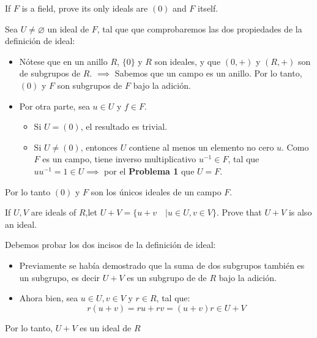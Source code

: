 \begin{problema}[Problema 2]
    If $F$ is a field, prove its only ideals are $(0)$ and $F$ itself.
    \begin{dem}
        Sea $U \neq \varnothing$ un ideal de  $F$, tal que que comprobaremos las dos propiedades de la definición de ideal: 

        \begin{itemize}
            \item Nótese que en un anillo $R$, $\{0\}$ y $R$ son ideales, y que $(0,+)$ y $(R,+)$ son de subgrupos de $R$. $\implies$ Sabemos que un campo es un anillo. Por lo tanto, $(0)$ y $F$ son subgrupos de $F$ bajo la adición. 
            \item Por otra parte, sea $u\in U$ y $f\in F$. 
                \begin{itemize}
                    \item Si $U=(0)$, el resultado es trivial. 
                    \item Si $U\neq (0)$, entonces $U$ contiene al menos un elemento no cero $u$. Como $F$ es un campo, tiene inverso multiplicativo $u^{-1}\in F$, tal que $uu^{-1}=1\in U\implies$ por el \textbf{Problema 1} que $U=F$.
                \end{itemize}  
        \end{itemize}
        Por lo tanto $(0)$ y $F$ son los únicos ideales de un campo $F$.
    \end{dem}
\end{problema}
\begin{problema}[Problema 5]
    If $U, V$ are ideals of $R$,let $U+V= \{u+v\quad |u\in U,v\in V\}$. Prove that $U + V$ is also an ideal.
    \begin{dem}
        Debemos probar los dos incisos de la definición de ideal:
        \begin{itemize}
            \item Previamente se había demostrado que la suma de dos subgrupos también es un subgrupo, es decir $U+V$ es un subgrupo de de $R$ bajo la adición. 
            \item Ahora bien, sea $u\in U,v\in V$ y $r\in R$, tal que: 
                    $$r(u+v)=ru+rv = (u+v)r\in U+V$$
        \end{itemize}
        Por lo tanto, $U+V$ es un ideal de $R$ 
    \end{dem}
\end{problema}

